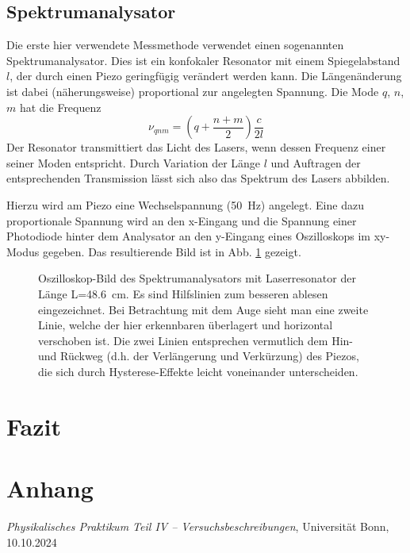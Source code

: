 \documentclass{article}
\begin{document}
\subsection{Spektrumanalysator}
Die erste hier verwendete Messmethode verwendet einen sogenannten Spektrumanalysator.
Dies ist ein konfokaler Resonator mit einem Spiegelabstand $l$, der durch einen Piezo geringfügig verändert werden kann.
Die Längenänderung ist dabei (näherungsweise) proportional zur angelegten Spannung.
Die Mode $q$, $n$, $m$ hat die Frequenz
\begin{equation}
  \nu_{qnm} = (q + \frac{n + m}{2})\frac{c}{2l}
\end{equation}
Der Resonator transmittiert das Licht des Lasers, wenn dessen Frequenz einer seiner Moden entspricht.
Durch Variation der Länge $l$ und Auftragen der entsprechenden Transmission lässt sich also das Spektrum des Lasers abbilden.

Hierzu wird am Piezo eine Wechselspannung (\SI{50}{\Hz}) angelegt.
Eine dazu proportionale Spannung wird an den x-Eingang und die Spannung einer Photodiode hinter
dem Analysator an den y-Eingang eines Oszilloskops im xy-Modus gegeben.
Das resultierende Bild ist in Abb. \ref{fig:analysator-kurz} gezeigt.

\begin{figure}[h]
  \centering
  \caption{
    Oszilloskop-Bild des Spektrumanalysators mit Laserresonator der Länge L=\SI{48.6}{\cm}.
    Es sind Hilfslinien zum besseren ablesen eingezeichnet.
    Bei Betrachtung mit dem Auge sieht man eine zweite Linie, welche der hier erkennbaren überlagert und horizontal verschoben ist.
    Die zwei Linien entsprechen vermutlich dem Hin- und Rückweg (d.h. der Verlängerung und Verkürzung) des Piezos, die sich
    durch Hysterese-Effekte leicht voneinander unterscheiden.}
  \label{fig:analysator-kurz}
\end{figure}




\clearpage
\section{Fazit}



\clearpage
\section{Anhang}



\clearpage
\begin{thebibliography}{9}

\textit{Physikalisches Praktikum Teil IV -- Versuchsbeschreibungen}, Universität Bonn, 10.10.2024



\end{thebibliography}
\end{document}
